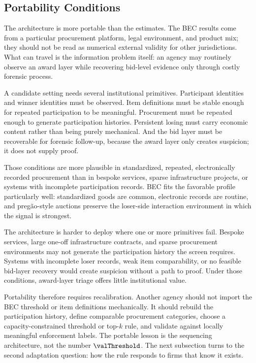 \subsection{Portability Conditions}
\label{sec:portability_v18}

The architecture is more portable than the estimates. The BEC
results come from a particular procurement platform, legal
environment, and product mix; they should not be read as
numerical external validity for other jurisdictions. What can
travel is the information problem itself: an agency may
routinely observe an award layer while recovering bid-level
evidence only through costly forensic process.

A candidate setting needs several institutional primitives.
Participant identities and winner identities must be observed.
Item definitions must be stable enough for repeated
participation to be meaningful. Procurement must be repeated
enough to generate participation histories. Persistent losing
must carry economic content rather than being purely
mechanical. And the bid layer must be recoverable for forensic
follow-up, because the award layer only creates suspicion; it
does not supply proof.

Those conditions are more plausible in standardized, repeated,
electronically recorded procurement than in bespoke services,
sparse infrastructure projects, or systems with incomplete
participation records. BEC fits the favorable profile
particularly well: standardized goods are common, electronic
records are routine, and pregão-style auctions preserve the
loser-side interaction environment in which the signal is
strongest.

The architecture is harder to deploy where one or more
primitives fail. Bespoke services, large one-off infrastructure
contracts, and sparse procurement environments may not generate
the participation history the screen requires. Systems with
incomplete loser records, weak item comparability, or no
feasible bid-layer recovery would create suspicion without a
path to proof. Under those conditions, award-layer triage
offers little institutional value.

Portability therefore requires recalibration. Another agency
should not import the BEC threshold or item definitions
mechanically. It should rebuild the participation history,
define comparable procurement categories, choose a
capacity-constrained threshold or top-$k$ rule, and validate
against locally meaningful enforcement labels. The portable
lesson is the sequencing architecture, not the number
$\valThreshold$. The next subsection turns to the second
adaptation question: how the rule responds to firms that know
it exists.

